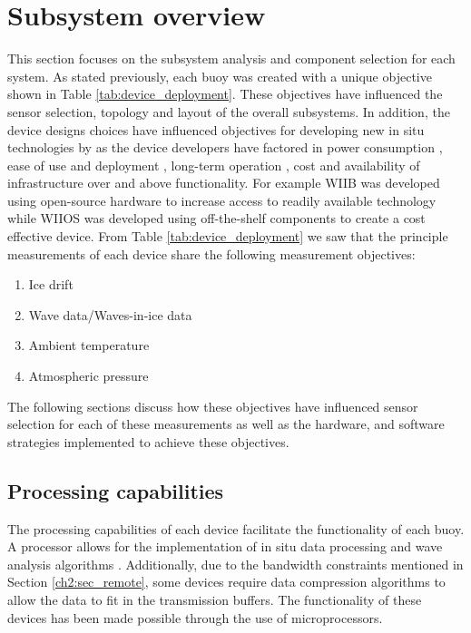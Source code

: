 \section{Subsystem overview}

This section focuses on the subsystem analysis and component selection for each system. As stated previously, each buoy was created with a unique objective shown in Table \ref{tab:device_deployment}. These objectives have influenced the sensor selection, topology and layout of the overall subsystems. In addition, the device designs choices have influenced objectives for developing new in situ technologies by \textcite{kennicutt2016delivering} as the device developers have factored in power consumption \cite{kohout2015device}, ease of use and deployment \cite{rabault2019open}, long-term operation \cite{doble2017robust}, cost \cite{PLANCK2019102792,rabault2019open} and availability of infrastructure \cite{doble2017robust} over and above functionality. For example WIIB was developed using open-source hardware \cite{rabault2019open} to increase access to readily available technology while WIIOS was developed using off-the-shelf components \cite{kohout2015device} to create a cost effective device. From Table \ref{tab:device_deployment} we saw that the principle measurements of each device share the following measurement objectives:

\begin{enumerate}
	\item Ice drift
	\item Wave data/Waves-in-ice data
	\item Ambient temperature
	\item Atmospheric pressure 
\end{enumerate}

The following sections discuss how these objectives have influenced sensor selection for each of these measurements as well as the hardware, and software strategies implemented to achieve these objectives.

\subsection{Processing capabilities}

The processing capabilities of each device facilitate the functionality of each buoy. A processor allows for the implementation of in situ data processing and wave analysis algorithms \cite{kohout2015device,rabault2019open}. Additionally, due to the bandwidth constraints mentioned in Section \ref{ch2:sec_remote}, some devices require data compression algorithms to allow the data to fit in the transmission buffers. The functionality of these devices has been made possible through the use of microprocessors.

